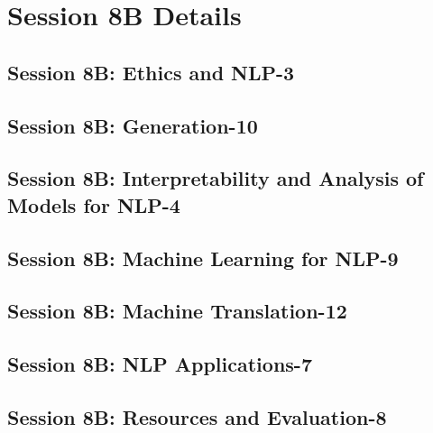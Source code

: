 \section{Session 8B Details}
\subsection{\large Session 8B: Ethics and NLP-3}
\label{parallel-session-8B-trackA}
\TrackALoc\hfill\sessionchair{}{}
\clearpage
\subsection{\large Session 8B: Generation-10}
\label{parallel-session-8B-trackB}
\TrackBLoc\hfill\sessionchair{}{}
\clearpage
\subsection{\large Session 8B: Interpretability and Analysis of Models for NLP-4}
\label{parallel-session-8B-trackC}
\TrackCLoc\hfill\sessionchair{}{}
\clearpage
\subsection{\large Session 8B: Machine Learning for NLP-9}
\label{parallel-session-8B-trackD}
\TrackDLoc\hfill\sessionchair{}{}
\clearpage
\subsection{\large Session 8B: Machine Translation-12}
\label{parallel-session-8B-trackE}
\TrackELoc\hfill\sessionchair{}{}
\clearpage
\subsection{\large Session 8B: NLP Applications-7}
\label{parallel-session-8B-trackF}
\TrackFLoc\hfill\sessionchair{}{}
\clearpage
\subsection{\large Session 8B: Resources and Evaluation-8}
\label{parallel-session-8B-trackG}
\TrackGLoc\hfill\sessionchair{}{}
\clearpage
